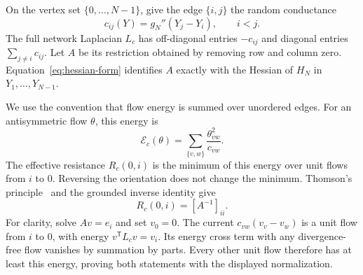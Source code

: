 \documentclass[11pt]{article}
\theoremstyle{remark}\newtheorem{remark}[theorem]{Remark}
\begin{document}
On the vertex set $\{0,\ldots,N-1\}$, give the edge $\{i,j\}$
the random conductance
\[
 c_{ij}(Y)=g_N''(Y_j-Y_i),\qquad i<j.
\]
The full network Laplacian $L_c$ has off-diagonal entries
$-c_{ij}$ and diagonal entries $\sum_{j\ne i}c_{ij}$.
Let $A$ be its restriction obtained by removing row and column
zero.  Equation~\eqref{eq:hessian-form} identifies $A$ exactly
with the Hessian of $H_N$ in $Y_1,\ldots,Y_{N-1}$.

We use the convention that flow energy is summed over unordered
edges.  For an antisymmetric flow $\theta$, this energy is
\[
 \mathcal E_c(\theta)=\sum_{\{v,w\}}
                               \frac{\theta_{vw}^2}{c_{vw}}.
\]
The effective resistance $R_c(0,i)$ is the minimum of this energy
over unit flows from $i$ to $0$.  Reversing the orientation does
not change the minimum.  Thomson's principle~\cite{LP} and the
grounded inverse identity give
\begin{equation}\label{eq:grounded-resistance}
 R_c(0,i)=[A^{-1}]_{ii}.
\end{equation}
For clarity, solve $Av=e_i$ and set $v_0=0$.  The current
$c_{vw}(v_v-v_w)$ is a unit flow from $i$ to $0$, with energy
$v^{\mathsf T}L_cv=v_i$.  Its energy cross term with any
divergence-free flow vanishes by summation by parts.  Every other
unit flow therefore has at least this energy, proving both
statements with the displayed normalization.
\end{document}
